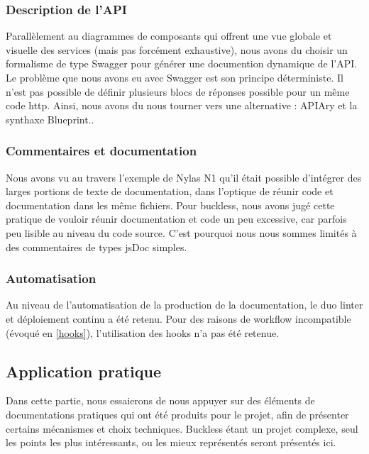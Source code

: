     \subsubsection{Description de l'API}
        Parallèlement au diagrammes de composants qui offrent une vue globale et visuelle des services
        (mais pas forcément exhaustive), nous avons du choisir un formalisme de type Swagger pour
        générer une documention dynamique de l'API.\\
        Le problème que nous avons eu avec Swagger est son principe déterministe\cite{determinism}.
        Il n'est pas possible de définir plusieurs blocs de réponses possible pour un même code http.
        Ainsi, nous avons du nous tourner vers une alternative : APIAry et la synthaxe Blueprint..

    \subsubsection{Commentaires et documentation}
        Nous avons vu au travers l'exemple de Nylas N1 qu'il était possible d'intégrer des larges
        portions de texte de documentation, dans l'optique de réunir code et documentation dans les
        même fichiers. Pour buckless, nous avons jugé cette pratique de vouloir réunir documentation
        et code un peu excessive, car parfois peu lisible au niveau du code source.
        C'est pourquoi nous nous sommes limités à des commentaires de types jsDoc simples.

    \subsubsection{Automatisation}
        Au niveau de l'automatisation de la production de la documentation, le duo linter et
        déploiement continu a été retenu. Pour des raisons de workflow incompatible (évoqué en
        \ref{hooks}), l'utilisation des hooks n'a pas été retenue.

\newpage
\subsection{Application pratique}
    Dans cette partie, nous essaierons de nous appuyer sur des éléments de documentations pratiques
    qui ont été produits pour le projet, afin de présenter certains mécanismes et choix techniques.
    Buckless étant un projet complexe, seul  les points les plus intéressants, ou les mieux représentés
    seront présentés ici.

